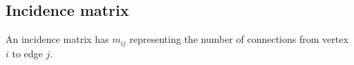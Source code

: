 
\subsection{Incidence matrix}

An incidence matrix has \(m_{ij}\) representing the number of connections from vertex \(i\) to edge \(j\).

